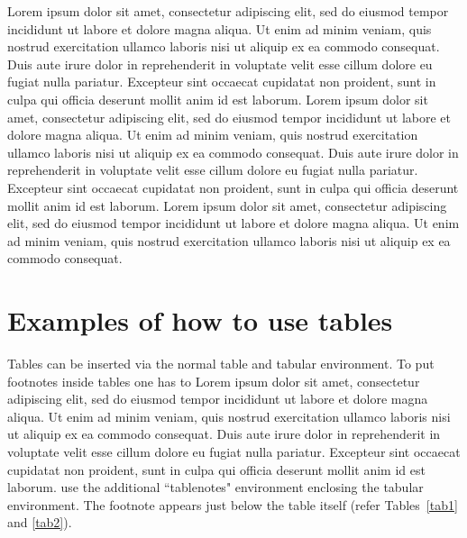 \documentclass[unnumsec,webpdf,contemporary,large]{oup-authoring-template}%
\theoremstyle{thmstyleone}%
\theoremstyle{thmstyletwo}%
\theoremstyle{thmstylethree}%
\begin{document}
Lorem ipsum dolor sit amet, consectetur adipiscing elit, sed do
eiusmod tempor incididunt ut labore et dolore magna aliqua. Ut enim ad minim veniam, quis nostrud exercitation ullamco laboris nisi ut aliquip ex ea commodo consequat. Duis aute irure dolor in reprehenderit in voluptate velit esse cillum dolore eu fugiat nulla pariatur. Excepteur sint occaecat cupidatat non proident, sunt in culpa qui officia deserunt mollit anim id est laborum. Lorem ipsum dolor sit amet, consectetur adipiscing elit, sed do
eiusmod tempor incididunt ut labore et dolore magna aliqua. Ut enim ad minim veniam, quis nostrud exercitation ullamco laboris nisi ut aliquip ex ea commodo consequat. Duis aute irure dolor in reprehenderit in voluptate velit esse cillum dolore eu fugiat nulla pariatur. Excepteur sint occaecat cupidatat non proident, sunt in culpa qui officia deserunt mollit anim id est laborum. 
Lorem ipsum dolor sit amet, consectetur adipiscing elit, sed do
eiusmod tempor incididunt ut labore et dolore magna aliqua. Ut enim ad minim veniam, quis nostrud exercitation ullamco laboris nisi ut aliquip ex ea commodo consequat. 


\section{Examples of how to use tables}\label{sec5}

Tables can be inserted via the normal table and tabular environment. To put
footnotes inside tables one has to Lorem ipsum dolor sit amet, consectetur adipiscing elit, sed do eiusmod tempor incididunt ut labore et dolore magna aliqua. Ut enim ad minim veniam, quis nostrud exercitation ullamco laboris nisi ut aliquip ex ea commodo consequat. Duis aute irure dolor in reprehenderit in voluptate velit esse cillum dolore eu fugiat nulla pariatur. Excepteur sint occaecat cupidatat non proident, sunt in culpa qui officia deserunt mollit anim id est laborum. use the additional ``tablenotes" environment
enclosing the tabular environment. The footnote appears just below the table
itself (refer Tables~\ref{tab1} and \ref{tab2}).
\end{document}
